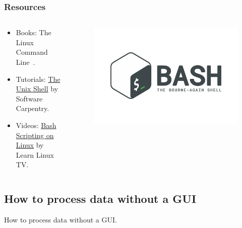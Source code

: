 \documentclass[aspectratio=169]{beamer}
\begin{document}
\begin{frame}
    \frametitle{Resources}
    \begin{columns}
        \begin{column}{0.5\textwidth}
            \begin{itemize}
                \item Books: The Linux Command Line~\cite{shotts2019}.
                \item Tutorials: \href{https://swcarpentry.github.io/shell-novice/}
                    {The Unix Shell} by Software Carpentry.
                \item Videos: 
                    \href{https://www.youtube.com/watch?v=2733cRPudvI&list=PLT98CRl2KxKGj-VKtApD8-zCqSaN2mD4w}
                    {Bash Scripting on Linux} by Learn Linux TV.
            \end{itemize}
        \end{column}
        \begin{column}{0.5\textwidth}
            \begin{figure}
                \centering
                \includegraphics[scale=0.05]{logos/bash.png}
            \end{figure}
        \end{column}
    \end{columns}

\end{frame}


\subsection{How to process data without a GUI}


\begin{frame}
    How to process data without a GUI.
\end{frame}
\end{document}
